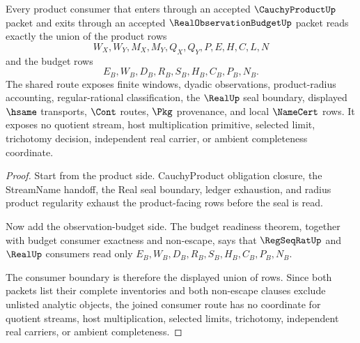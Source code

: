 \begin{theorem}
\label{thm:cauchy-product-budget-product-consumer-boundary}
Every product consumer that enters through an accepted $\CauchyProductUp$ packet and exits through an accepted $\RealObservationBudgetUp$ packet reads exactly the union of the product rows
$$
W_X,W_Y,M_X,M_Y,Q_X,Q_Y,P,E,H,C,L,N
$$
and the budget rows
$$
E_B,W_B,D_B,R_B,S_B,H_B,C_B,P_B,N_B.
$$
The shared route exposes finite windows, dyadic observations, product-radius accounting, regular-rational classification, the $\RealUp$ seal boundary, displayed $\hsame$ transports, $\Cont$ routes, $\Pkg$ provenance, and local $\NameCert$ rows. It exposes no quotient stream, host multiplication primitive, selected limit, trichotomy decision, independent real carrier, or ambient completeness coordinate.
\end{theorem}
\begin{proof}
Start from the product side. CauchyProduct obligation closure, the StreamName handoff, the Real seal boundary, ledger exhaustion, and radius product regularity exhaust the product-facing rows before the seal is read.

Now add the observation-budget side. The budget readiness theorem, together with budget consumer exactness and non-escape, says that $\RegSeqRatUp$ and $\RealUp$ consumers read only $E_B,W_B,D_B,R_B,S_B,H_B,C_B,P_B,N_B$.

The consumer boundary is therefore the displayed union of rows. Since both packets list their complete inventories and both non-escape clauses exclude unlisted analytic objects, the joined consumer route has no coordinate for quotient streams, host multiplication, selected limits, trichotomy, independent real carriers, or ambient completeness.
\end{proof}

